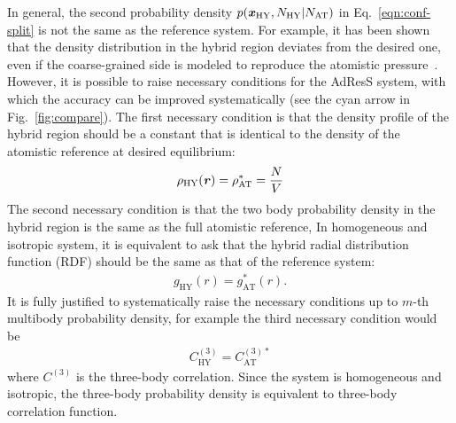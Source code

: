 \documentclass[epjST]{svjour}
\newcommand{\vect}[1]{\textbf{\textit{#1}}}
\newcommand{\AT}[0]{\textrm{AT}}
\newcommand{\HY}[0]{\textrm{HY}}
\begin{document}
In general, the second probability density $p(\vect x_\HY, N_\HY\vert N_\AT)$ in Eq.~\eqref{eqn:conf-split} 
is not the same as the reference system.  For example, it has been
shown that the density distribution in the hybrid region deviates from
the desired one, even if the coarse-grained side is modeled to
reproduce the atomistic pressure~\cite{poblete2010coupling}.  However,
it is possible to raise necessary conditions
for the AdResS system, with which the accuracy can be improved
systematically (see the cyan arrow in Fig.~\ref{fig:compare}).
The first necessary
condition is that the density profile of the hybrid region should be a
constant that is identical to the density of the atomistic reference
at desired equilibrium:
\begin{align}\label{eqn:necessary-1st}
  \rho_\HY(\vect r) = \rho_\AT^\ast = \frac NV
\end{align}
The second necessary condition is that the two body probability
density in the hybrid region is the same as the full atomistic
reference, In homogeneous and isotropic system, it is equivalent to
ask that the hybrid radial distribution function (RDF) should be the
same as that of the reference system:
\begin{align}\label{eqn:necessary-2nd}
  g_\HY(r) = g^\ast_\AT(r).
\end{align}
It is fully justified to systematically raise the necessary conditions
up to $m$-th multibody probability density, for example the third necessary condition would be
\begin{align}
  C^{(3)}_\HY = C^{(3)\ast}_\AT
\end{align}
where $C^{(3)}$ is the three-body correlation.
Since the system is homogeneous
and isotropic, the three-body probability density is equivalent to
three-body correlation function. 
\end{document}
